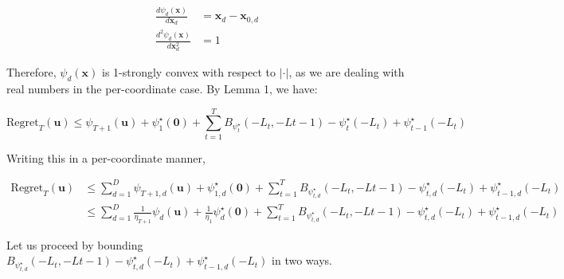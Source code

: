 \documentclass{article}
\newcommand{\Regret}{\text{Regret}}
\newcommand{\bx}{\mathbf{x}}
\newcommand{\bu}{\mathbf{u}}
\begin{document}
\begin{align*}
  \frac{d \psi_d(\bx)}{d \bx_d} &= \bx_d - \bx_{0,d} \\
  \frac{d^2 \psi_d(\bx)}{d \bx_d^2} &= 1
\end{align*}

Therefore, $\psi_d(\bx)$ is 1-strongly convex with respect to $| \cdot |$, as we are dealing with real numbers in the
per-coordinate case. By Lemma 1, we have:

\[
  \Regret_T(\bu) \leq \psi_{T+1}(\bu) + \psi_{1}^\star (\textbf{0}) + \sum\limits_{t=1}^T B_{\psi_{t}^\star}(-L_t,
  -L{t-1}) - \psi_{t}^\star (-L_t) + \psi_{t-1}^\star(-L_t)
\]

Writing this in a per-coordinate manner,

\begin{align*}
  \Regret_T(\bu) 
  &\leq \sum\limits_{d=1}^D \psi_{T+1,d}(\bu) + \psi_{1,d}^\star (\textbf{0}) + \sum\limits_{t=1}^T
  B_{\psi_{t,d}^\star}(-L_t, -L{t-1}) - \psi_{t,d}^\star (-L_t) + \psi_{t-1,d}^\star(-L_t) \\
  &\leq \sum\limits_{d=1}^D \frac{1}{\eta_{T+1}}\psi_{d}(\bu) + \frac{1}{\eta_1}\psi_{d}^\star (\textbf{0}) + \sum\limits_{t=1}^T
  B_{\psi_{t,d}^\star}(-L_t, -L{t-1}) - \psi_{t,d}^\star (-L_t) + \psi_{t-1,d}^\star(-L_t)
\end{align*}

Let us proceed by bounding $B_{\psi_{t,d}^\star}(-L_t, -L{t-1}) - \psi_{t,d}^\star (-L_t) + \psi_{t-1,d}^\star(-L_t)$ in
two ways.
\end{document}
